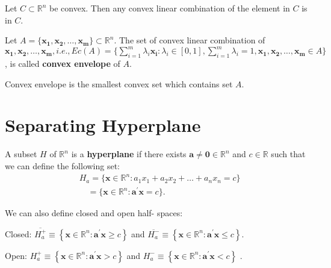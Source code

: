 \begin{proposition}
    Let $C \subset \mathbb{R}^{n}$ be convex. Then any convex linear combination of the element in $C$ is in $C$.
\end{proposition}

\begin{definition}
    Let $A = \{\mathbf{x_1, x_2, \dots,x_m}\} \subset \mathbb{R}^{n} $. The set of convex linear combination of $\mathbf{x_1, x_2, \dots,x_m}, i.e., Ec(A) = \{\sum_{i=1}^{m} \lambda_i \mathbf{x_i} : \lambda_i \in [0,1], \sum_{i=1}^{m} \lambda_i = 1, \mathbf{x_1, x_2, \dots, x_m} \in A \}$, is called \textbf{convex envelope} of $A$.
\end{definition}

\begin{remark*}
    Convex envelope is the smallest convex set which contains set $A$.
\end{remark*}

\section{Separating Hyperplane}

\begin{definition}[Hyperplane]
    A subset \(H\) of \(\mathbb{R}^{n}\) is a \textbf{hyperplane} if
    there exists \(\mathbf{a} \neq \mathbf{0} \in \mathbb{R}^{n}\) and
    \(c \in \mathbb{R}\) such that we can define the following set:
    \[
        \begin{array}{rl} & H_{a} = \{\mathbf{x} \in \mathbb{R}^{n}: a_{1} x_{1} + a_{2} x_{2} + \ldots + a_{n} x_{n} = c \} \\ & \quad = \{\mathbf{x} \in \mathbb{R}^{n}: \mathbf{a}^{\prime} \mathbf{x} = c \} . \end{array}
    \]
\end{definition}

\begin{definition}
    We can also define closed and open half- spaces:

    Closed: \(\overline{H_{a}^{+}} \equiv \left\{\mathbf{x} \in \mathbb{R}^{n}: \mathbf{a}^{\prime} \mathbf{x} \geq c \right\}\) and \(\overline{H_{a}^{- }} \equiv \left\{\mathbf{x} \in \mathbb{R}^{n}: \mathbf{a}^{\prime} \mathbf{x} \leq c \right\}\).

    Open: \(H_{a}^{+} \equiv \left\{\mathbf{x} \in \mathbb{R}^{n}: \mathbf{a}^{\prime} \mathbf{x} > c \right\}\) and \(H_{a}^{- } \equiv \left\{\mathbf{x} \in \mathbb{R}^{n}: \mathbf{a}^{\prime} \mathbf{x}< c \right\}\)
    .
\end{definition}

